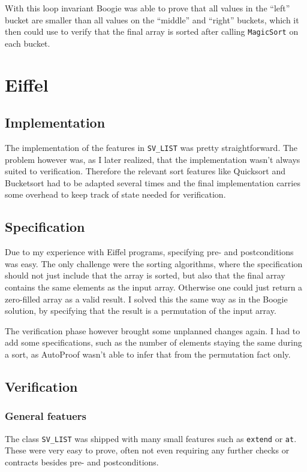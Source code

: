 \documentclass[a4paper,10pt]{article}
\begin{document}
With this loop invariant Boogie was able to prove that all values in the ``left'' bucket are smaller than all values on the ``middle'' and ``right'' buckets, 
which it then could use to verify that the final array is sorted after calling \lstinline!MagicSort! on each bucket.
\section{Eiffel}

\subsection{Implementation}

The implementation of the features in \lstinline!SV_LIST! was pretty straightforward.
The problem however was, as I later realized, that the implementation wasn't always suited to verification.
Therefore the relevant sort features like Quicksort and Bucketsort had to be adapted several times 
and the final implementation carries some overhead to keep track of state needed for verification.

\subsection{Specification}

Due to my experience with Eiffel programs, specifying pre- and postconditions was easy.
The only challenge were the sorting algorithms, where the specification should not just include that the array is sorted,
but also that the final array contains the same elements as the input array.
Otherwise one could just return a zero-filled array as a valid result.
I solved this the same way as in the Boogie solution, by specifying that the result is a permutation of the input array.

The verification phase however brought some unplanned changes again.
I had to add some specifications, such as the number of elements staying the same during a sort, 
as AutoProof wasn't able to infer that from the permutation fact only.

\subsection{Verification}

\subsubsection{General featuers}
The class \lstinline!SV_LIST! was shipped with many small features such as \lstinline!extend! or \lstinline!at!.
These were very easy to prove, often not even requiring any further checks or contracts besides pre- and postconditions.
\end{document}

